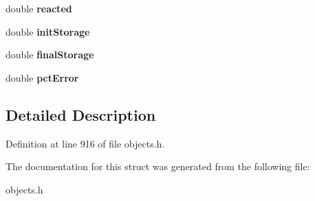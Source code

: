 \begin{DoxyCompactItemize}
\mbox{\label{struct_t_routing_totals_a74fd209e9593f228d3b10dfe82830a16}} 
double {\bfseries reacted}
\item 
\mbox{\label{struct_t_routing_totals_a9d790bfe173117a2e0a66dda16221337}} 
double {\bfseries init\+Storage}
\item 
\mbox{\label{struct_t_routing_totals_abe8e4d2ea662bd74d1fb8a14ab0a02ca}} 
double {\bfseries final\+Storage}
\item 
\mbox{\label{struct_t_routing_totals_a6fcd79c6a0e66f48c596ff03935b6675}} 
double {\bfseries pct\+Error}
\end{DoxyCompactItemize}


\subsection{Detailed Description}


Definition at line 916 of file objects.\+h.



The documentation for this struct was generated from the following file\+:\begin{DoxyCompactItemize}
\item 
objects.\+h\end{DoxyCompactItemize}
